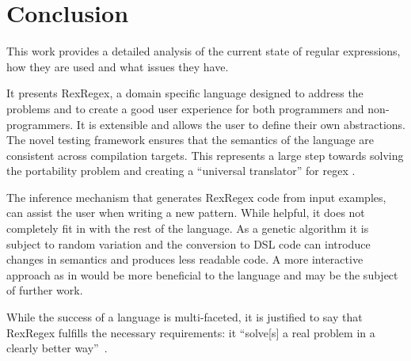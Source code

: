 
\chapter{Conclusion}

This work provides a detailed analysis of the current state of regular expressions, how they are used and what issues they have.

It presents RexRegex, a domain specific language designed to address the problems and to create a good user experience for both programmers and non-programmers. It is extensible and allows the user to define their own abstractions. The novel testing framework \utgast{} ensures that the semantics of the language are consistent across compilation targets. This represents a large step towards solving the portability problem and creating a \enquote{universal translator} for regex \cite{RegexNotLinguaFranca}.

The inference mechanism that generates RexRegex code from input examples, can assist the user when writing a new pattern. While helpful, it does not completely fit in with the rest of the language. As a genetic algorithm it is subject to random variation and the conversion to DSL code can introduce changes in semantics and produces less readable code. A more interactive approach as in \cite{noxoneRegexGenerator} would be more beneficial to the language and may be the subject of further work.

While the success of a language is multi-faceted, it is justified to say that RexRegex fulfills the necessary requirements: it \enquote{solve[s] a real problem in a clearly better way}~\cite{OnSuccessfulLanuageDesignKernighan}.

